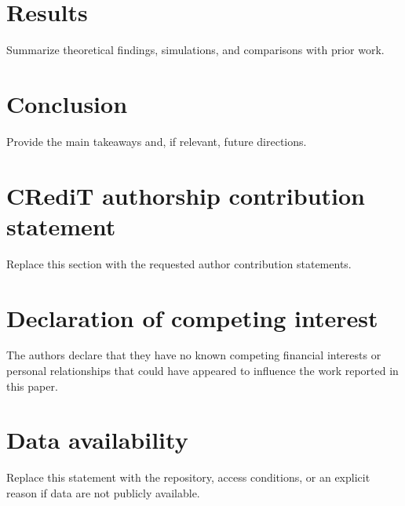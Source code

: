 \documentclass[preprint,12pt]{elsarticle}
\begin{document}
\section{Results}
Summarize theoretical findings, simulations, and comparisons with prior work.

\section{Conclusion}
Provide the main takeaways and, if relevant, future directions.

\section*{CRediT authorship contribution statement}
Replace this section with the requested author contribution statements.

\section*{Declaration of competing interest}
The authors declare that they have no known competing financial interests or
personal relationships that could have appeared to influence the work reported
in this paper.

\section*{Data availability}
Replace this statement with the repository, access conditions, or an explicit
reason if data are not publicly available.



\end{document}
